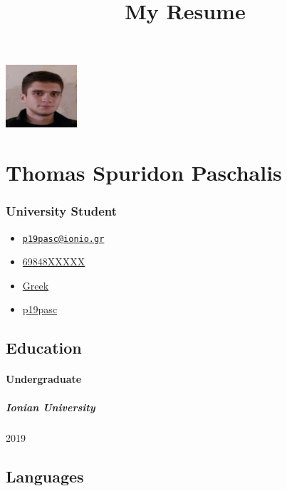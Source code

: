\documentclass[english,]{article}
\title{My Resume}
\date{}
\providecommand{\tightlist}{%
  \setlength{\itemsep}{0pt}\setlength{\parskip}{0pt}}
\let\oldparagraph\paragraph
\renewcommand{\paragraph}[1]{\oldparagraph{#1}\mbox{}}
\let\oldsubparagraph\subparagraph
\renewcommand{\subparagraph}[1]{\oldsubparagraph{#1}\mbox{}}
\begin{document}
\maketitle

\includegraphics{cv_profile.png}

\hypertarget{thomas-spuridon-paschalis}{%
\section{Thomas Spuridon Paschalis}\label{thomas-spuridon-paschalis}}

\hypertarget{university-student}{%
\subsubsection{University Student}\label{university-student}}

\begin{itemize}
\tightlist
\item
  \emph{} \href{mailto:p19pasc@ionio.gr}{\nolinkurl{p19pasc@ionio.gr}}
\item
  \emph{} \href{tel:69848XXXXX}{69848XXXXX}
\item
  \emph{} \href{}{Greek}
\item
  \emph{} \href{http://github.com/p19pasc}{p19pasc}
\end{itemize}

\hypertarget{education}{%
\subsection{Education}\label{education}}

\hypertarget{undergraduate}{%
\paragraph{Undergraduate}\label{undergraduate}}

\hypertarget{ionian-university}{%
\subparagraph{Ionian University}\label{ionian-university}}

2019

\hypertarget{languages}{%
\subsection{Languages}\label{languages}}
\end{document}
